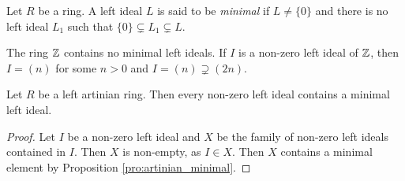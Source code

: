 \begin{definition}
    Let $R$ be a ring. A left ideal $L$ is said to be \emph{minimal}
    if $L\ne\{0\}$ and there is no left ideal $L_1$
    such that $\{0\}\subsetneq L_1\subsetneq L$.
\end{definition}

The ring $\mathbb{Z}$ contains no minimal left ideals. If $I$ is a non-zero 
left ideal of $\mathbb{Z}$, then
$I=(n)$ for some $n>0$ and $I=(n)\supsetneq (2n)$. 

\begin{proposition}
    Let $R$ be a left artinian ring. 
    Then every non-zero left ideal contains a minimal left ideal. 
\end{proposition}

\begin{proof}
    Let $I$ be a non-zero left ideal and 
    $X$ be the family of non-zero left ideals contained in $I$. Then $X$ is non-empty, as 
    $I\in X$. Then $X$ contains a minimal element by Proposition \ref{pro:artinian_minimal}. 
\end{proof}




